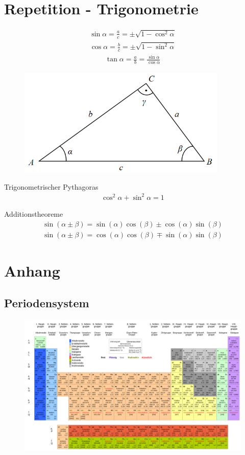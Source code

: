 \documentclass[17pt]{extarticle}
\begin{document}
\section{Repetition - Trigonometrie}
	\begin{align}
		\sin \alpha = \frac{a}{c} = \pm \sqrt{1 - \cos^2 \alpha}
	\end{align}
	\begin{align}
		\cos \alpha = \frac{b}{c} = \pm \sqrt{1 - \sin^2 \alpha}
	\end{align}
	\begin{align}
		\tan \alpha = \frac{a}{b} = \frac{\sin \alpha}{\cos \alpha}
	\end{align}
	\begin{figure}[h!]
		\centering
		\includegraphics[width=10cm]{img/Trigonometrie.png}
	\end{figure}
	
	Trigonometrischer Pythagoras
	\begin{align}
		\cos^2 \alpha + \sin^2 \alpha = 1
	\end{align}

	Additionstheoreme
	\begin{align}
		\sin(\alpha \pm \beta) = \sin(\alpha) \cos(\beta) \pm \cos(\alpha) \sin(\beta)
	\end{align}
	\begin{align}
		\sin(\alpha \pm \beta) = \cos(\alpha) \cos(\beta) \mp \sin(\alpha) \sin(\beta)
	\end{align}

\section{Anhang}
	\subsection{Periodensystem}
	\begin{figure}[h!]
		\centering
		\includegraphics[width=25cm, angle=90]{img/Periodensystem.png}
	\end{figure}
\end{document}
